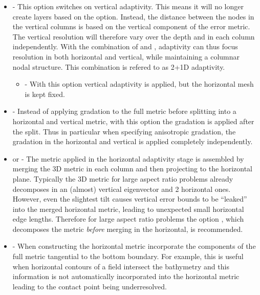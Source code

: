 \begin{itemize}
\item {} -
This option switches on vertical adaptivity. This means it will no longer create
layers based on the  option. Instead, the distance
between the nodes in the vertical columns is based on the vertical component of
the error metric. The vertical resolution will therefore vary over the depth and 
in each column independently. With the combination of
 and
, adaptivity can thus focus resolution
in both horizontal and vertical, while maintaining a columnar nodal structure.
This combination is refered to as 2+1D adaptivity.
\begin{itemize}
\item {} - With this option vertical adaptivity is
applied, but the horizontal mesh is kept fixed.
\end{itemize}
\item {} - Instead of applying gradation to the full metric
before splitting into a horizontal and vertical metric, with this option the
gradation is applied after the split. Thus in particular when specifying
anisotropic gradation, the gradation in the horizontal and vertical is applied
completely independently.
\item {} or  -
The metric applied in the horizontal adaptivity stage is assembled by merging
the 3D metric in each column and then projecting to the horizontal plane. 
Typically the 3D metric for large aspect ratio problems already decomposes 
in an (almost) vertical eigenvector and 2 horizontal ones. 
However, even the slightest tilt causes vertical error bounds 
to be ``leaked'' into the merged horizontal metric, leading to unexpected small
horizontal edge lengths. Therefore for large aspect ratio problems the option
, which decomposes the metric \emph{before}
merging in the horizontal, is recommended.
\item {} - When constructing the horizontal metric
incorporate the components of the full metric tangential to the bottom boundary.
For example, this is useful when horizontal contours of a field intersect the
bathymetry and this information is not automatically incorporated into the
horizontal metric leading to the contact point being underresolved.
\end{itemize}

